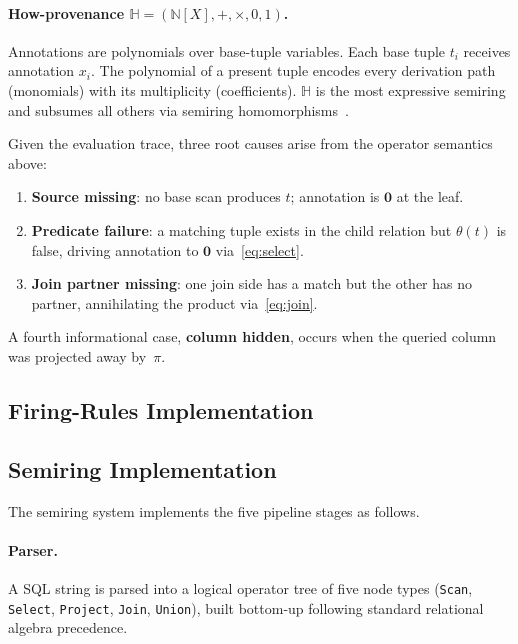 \documentclass{llncs}
\begin{document}
\paragraph{How-provenance $\mathbb{H} = (\mathbb{N}[X], +, \times, 0, 1)$.}
Annotations are polynomials over base-tuple variables. Each base tuple
$t_i$ receives annotation $x_i$. The polynomial of a present tuple
encodes every derivation path (monomials) with its multiplicity
(coefficients). $\mathbb{H}$ is the most expressive semiring and
subsumes all others via semiring homomorphisms~\cite{Green2007}.

Given the evaluation trace, three root causes arise from the operator
semantics above:
\begin{enumerate}
  \item \textbf{Source missing}: no base scan produces $t$; annotation
    is $\mathbf{0}$ at the leaf.
  \item \textbf{Predicate failure}: a matching tuple exists in the child
    relation but $\theta(t)$ is false, driving annotation to $\mathbf{0}$
    via~\eqref{eq:select}.
  \item \textbf{Join partner missing}: one join side has a match but the
    other has no partner, annihilating the product via~\eqref{eq:join}.
\end{enumerate}
A fourth informational case, \textbf{column hidden}, occurs when the
queried column was projected away by~$\pi$.

\subsection{Firing-Rules Implementation}
\label{sec:impl-fr}


\subsection{Semiring Implementation}
\label{sec:impl-semiring}

The semiring system implements the five pipeline stages as follows.

\paragraph{Parser.}
A SQL string is parsed into a logical operator tree of five node types
(\texttt{Scan}, \texttt{Select}, \texttt{Project}, \texttt{Join},
\texttt{Union}), built bottom-up following standard relational algebra
precedence.
\end{document}

